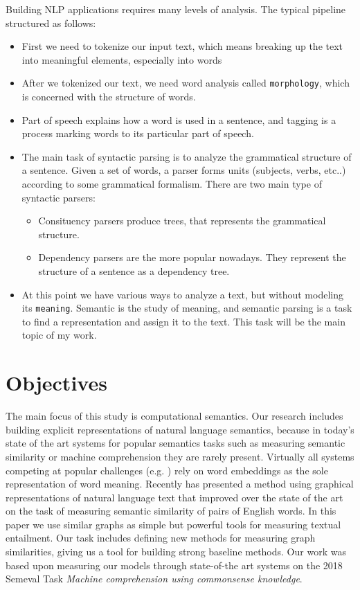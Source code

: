 Building NLP applications requires many levels of analysis.
The typical pipeline structured as follows:
\begin{itemize}
	\item First we need to tokenize our input text, which means breaking up the text into meaningful elements, especially into words
    \item After we tokenized our text, we need word analysis called \texttt{morphology}, which is concerned with the structure of words.
    \item Part of speech explains how a word is used in a sentence, and tagging is a process marking words to its particular part of speech.
    \item The main task of syntactic parsing is to analyze the grammatical structure of a sentence. Given a set of words, a parser forms units (subjects, verbs, etc..) according to some grammatical formalism.
    There are two main type of syntactic parsers:
    \begin{itemize}
        \item Consituency parsers produce trees, that represents the grammatical structure.
        \item Dependency parsers are the more popular nowadays. They represent the structure of a sentence as a dependency tree.
    \end{itemize}
    \item At this point we have various ways to analyze a text, but without modeling its \texttt{meaning}. Semantic is the study of meaning, and semantic parsing is a task to find a representation and assign it to the text. This task will be the main topic of my work.
\end{itemize}

\section{Objectives}
The main focus of this study is computational semantics. Our research includes building explicit representations of natural language semantics, because in today's state of the art systems for popular semantics tasks such as measuring semantic similarity or machine comprehension they are rarely present. Virtually all systems
competing at popular challenges (e.g. \cite{Cer:2017,Collados:2017}) rely on word embeddings as the sole representation of word meaning. Recently \cite{Recski:2016c} has presented a method using graphical representations of natural language text that improved over the state of the art on the task of
measuring semantic similarity of pairs of English words. In this paper
we use similar graphs as simple but powerful tools for measuring textual
entailment. Our task includes defining new methods for measuring graph similarities, giving us a tool for building strong baseline methods. Our work was based upon measuring our models through state-of-the art systems on the 2018 Semeval Task \textit{Machine comprehension using commonsense knowledge}.

